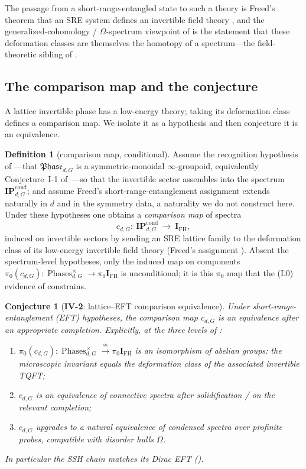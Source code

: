 \documentclass[12pt]{article}
\newcommand{\Phase}{\mathfrak{Phase}}          %
\newcommand{\Phases}{\operatorname{Phases}}    %
\newcommand{\IPcond}{\mathbf{IP}^{\mathrm{cond}}}  %
\newcommand{\dis}{\Omega}                       %
\newcommand{\IFH}{\mathbf{I}_{\mathrm{FH}}}  %
\theoremstyle{definition}
\newtheorem{definition}[definition]{Definition}
\theoremstyle{remark}
\theoremstyle{plain}
\newtheorem*{conjecture}{Conjecture}
\begin{document}
The passage from a short-range-entangled state to such a theory is Freed's
theorem that an SRE system defines an invertible field theory
\cite{freed-sre}, and the generalized-cohomology / $\Omega$-spectrum viewpoint of
\cite{gaiotto-jf,xiong-minimalist} is the statement that these deformation
classes are themselves the homotopy of a spectrum---the field-theoretic sibling
of .

\subsection{The comparison map and the conjecture}

A lattice invertible phase has a low-energy theory; taking its deformation class
defines a comparison map. We isolate it as a hypothesis and then conjecture it is
an equivalence.

\begin{definition}[comparison map, conditional]
\label{def:comp}
Assume the recognition hypothesis of ---that
$\Phase_{d,G}$ is a symmetric-monoidal $\infty$-groupoid, equivalently
Conjecture~I-1 of~\cite{paperLocality}---so that the invertible sector assembles
into the spectrum $\IPcond_{d,G}$; and assume Freed's short-range-entanglement
assignment extends naturally in $d$ and in the symmetry data, a naturality we do
not construct here. Under these hypotheses one obtains a \emph{comparison map} of
spectra
\[
  c_{d,G}:\ \IPcond_{d,G}\ \longrightarrow\ \IFH,
\]
induced on invertible sectors by sending an SRE lattice family to the
deformation class of its low-energy invertible field theory (Freed's assignment
\cite{freed-sre}). Absent the spectrum-level hypotheses, only the induced map on
components $\pi_0(c_{d,G}):\Phases_{d,G}^{\times}\to\pi_0\IFH$ is unconditional;
it is this $\pi_0$ map that the (L0) evidence of  constrains.
\end{definition}

\begin{conjecture}[\textbf{IV-2}: lattice--EFT comparison equivalence]
\label{conj:iv2}
Under short-range-entanglement (EFT) hypotheses, the comparison map $c_{d,G}$ is
an equivalence after an appropriate completion. Explicitly, at the three levels
of :
\begin{enumerate}
\item[\textbf{(L0)}] $\pi_0(c_{d,G}):\Phases_{d,G}^{\times}\xrightarrow{\ \cong\ }
  \pi_0\IFH$ is an isomorphism of abelian groups: the microscopic invariant
  equals the deformation class of the associated invertible TQFT;
\item[\textbf{(L1)}] $c_{d,G}$ is an equivalence of connective spectra after
  solidification / on the relevant completion;
\item[\textbf{(L2)}] $c_{d,G}$ upgrades to a natural equivalence of condensed
  spectra over profinite probes, compatible with disorder hulls $\dis$.
\end{enumerate}
In particular the SSH chain matches its Dirac EFT ().
\end{conjecture}
\end{document}
